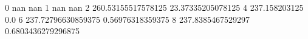 0 nan nan
1 nan nan
2 260.53155517578125 23.37335205078125
4 237.158203125 0.0
6 237.72796630859375 0.56976318359375
8 237.8385467529297 0.6803436279296875
